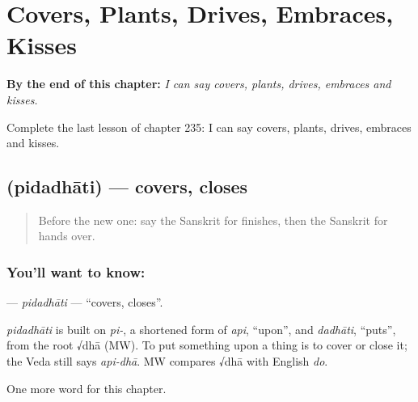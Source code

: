 
\chapter{Covers, Plants, Drives, Embraces, Kisses}
\label{ch:sa-covers-plants-drives-embraces-kisses}

\begin{chapteropening}
\textbf{By the end of this chapter:} \emph{I can say covers, plants, drives, embraces and kisses.}

Complete the last lesson of chapter 235: I can say covers, plants, drives, embraces and kisses.
\end{chapteropening}

\section[\texorpdfstring{\sk{पिदधाति} (pidadhāti)}{पिदधाति (pidadhāti)}]{ (pidadhāti) — covers, closes}

\label{lesson:SA-C235-pidadhati}



\begin{quote}
Before the new one: say the Sanskrit for finishes, then the Sanskrit for hands over.
\end{quote}

\subsection*{You'll want to know: }
\textbf{} — \emph{pidadhāti} — \textquotedblleft{}covers, closes\textquotedblright{}.

\begin{cousinweb}
\emph{pidadhāti} is built on \emph{pi-}, a shortened form of \emph{api}, \textquotedblleft{}upon\textquotedblright{}, and \emph{dadhāti}, \textquotedblleft{}puts\textquotedblright{}, from the root √dhā (MW). To put something upon a thing is to cover or close it; the Veda still says \emph{api-dhā}. MW compares √dhā with English \emph{do}.
\end{cousinweb}

\begin{grammarlens}[title={What you've built}]
One more word for this chapter.
\end{grammarlens}


